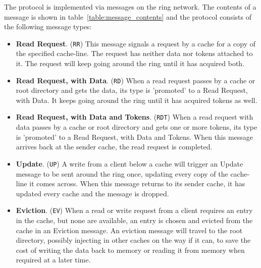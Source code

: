 The protocol is implemented via messages on the ring network. The contents of a message is shown in table~\ref{table:message_contents} and the protocol consists of the following message types:
\begin{itemize}
  \item {\bf Read Request}. ({\tt RR}) This message signals a request by a cache for a copy of the specified cache-line. The request has neither data nor tokens attached to it. The request will keep going around the ring until it has acquired both.

  \item {\bf Read Request, with Data}. ({\tt RD}) When a read request passes by a cache or root directory and gets the data, its type is 'promoted' to a Read Request, with Data. It keeps going around the ring until it has acquired tokens as well.

  \item {\bf Read Request, with Data and Tokens}. ({\tt RDT}) When a read request with data passes by a cache or root directory and gets one or more tokens, its type is 'promoted' to a Read Request, with Data and Tokens. When this message arrives back at the sender cache, the read request is completed.

  \item {\bf Update}. ({\tt UP}) A write from a client below a cache will trigger an Update message to be sent around the ring once, updating every copy of the cache-line it comes across. When this message returns to its sender cache, it has updated every cache and the message is dropped.

  \item {\bf Eviction}. ({\tt EV}) When a read or write request from a client requires an entry in the cache, but none are available, an entry is chosen and evicted from the cache in an Eviction message. An eviction message will travel to the root directory, possibly injecting in other caches on the way if it can, to save the cost of writing the data back to memory or reading it from memory when required at a later time.
\end{itemize}

